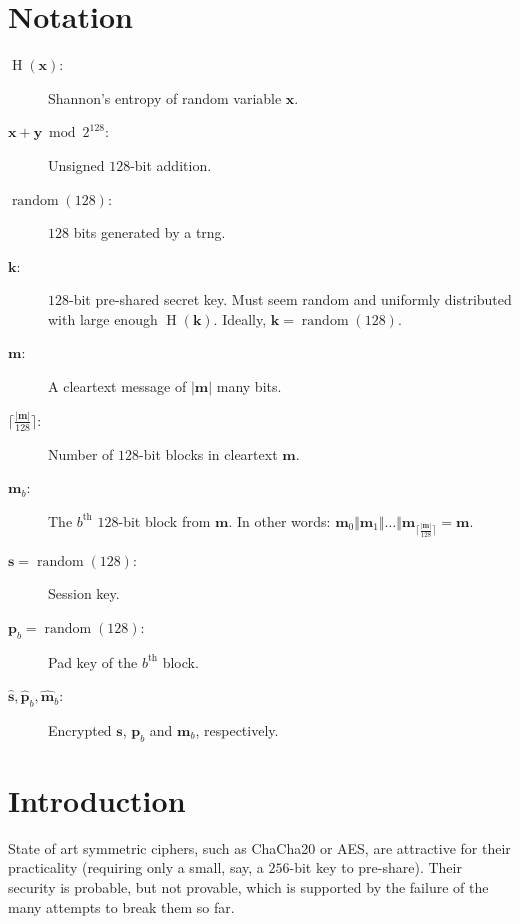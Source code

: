 \documentclass[twocolumn,hidelinks]{article}
\DeclareMathOperator{\random}{random}
\DeclareMathOperator{\entropy}{H}
\begin{document}
\section*{Notation}
\begin{description}
    \item[$\entropy(\mathbf{x})$:]  Shannon's entropy of random variable
        $\mathbf{x}$.

    \item[$\mathbf{x} + \mathbf{y} \bmod{2^{128}}$:]  Unsigned $128$-bit
        addition.

    \item[$\random(128)$:]  $128$ bits generated by a \gls{trng}.

    \item[$\mathbf{k}$:]  $128$-bit pre-shared secret key.  Must seem
        random and uniformly distributed with large enough
        $\entropy(\mathbf{k})$.  Ideally, $\mathbf{k} = \random(128)$.

    \item[$\mathbf{m}$:]  A cleartext message of $|\mathbf{m}|$ many bits.

    \item[$\lceil\frac{|\mathbf{m}|}{128}\rceil$:]  Number of $128$-bit
        blocks in cleartext $\mathbf{m}$.

    \item[$\mathbf{m}_b$:]  The $b^{\text{th}}$ $128$-bit block from
        $\mathbf{m}$.  In other words: $\mathbf{m}_0 \Vert \mathbf{m}_1
        \Vert \ldots \Vert
        \mathbf{m}_{\lceil\frac{|\mathbf{m}|}{128}\rceil} = \mathbf{m}$.

    \item[$\mathbf{s} = \random(128)$:]  Session key.

    \item[$\mathbf{p}_b = \random(128)$:]  Pad key of the $b^{\text{th}}$
        block.

    \item[$\mathbf{\hat s}, \mathbf{\hat p}_b, \mathbf{\hat m}_b$:]
        Encrypted $\mathbf{s}$, $\mathbf{p}_b$ and $\mathbf{m}_b$,
        respectively.
\end{description}

\tableofcontents

\section{Introduction}
State of art symmetric ciphers, such as ChaCha20 or AES, are attractive for
their practicality (requiring only a small, say, a $256$-bit key to
pre-share).  Their security is probable, but not provable, which is
supported by the failure of the many attempts to break them so far.
\end{document}

